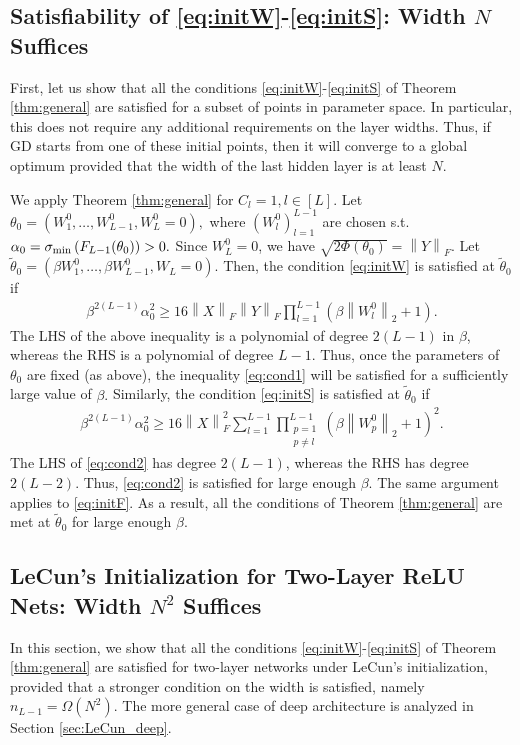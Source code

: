 \documentclass{article}
\newcommand{\norm}[1]{\left\|#1\right\|}
\newcommand{\svmin}[1]{\sigma_{\rm min}\left(#1\right)}
\begin{document}
\subsection{Satisfiability of \eqref{eq:initW}-\eqref{eq:initS}: Width $N$ Suffices}\label{sec:N}
First, let us show that all the conditions \eqref{eq:initW}-\eqref{eq:initS} of Theorem \ref{thm:general} are satisfied
for a subset of points in parameter space. 
In particular, this does not require any additional requirements on the layer widths. 
Thus, if GD starts from one of these initial points, 
then it will converge to a global optimum provided that the width of the last hidden layer is at least $N$.

We apply Theorem \ref{thm:general} for $C_l=1, l\in[L].$
Let $\theta_0=(W_1^0,\ldots,W_{L-1}^0,W_L^0=0),$
where $(W_l^0)_{l=1}^{L-1}$ are chosen s.t.\ $\alpha_0=\svmin{F_{L-1}(\theta_0)}>0.$
Since $W_L^0=0$, we have $\sqrt{2\Phi(\theta_0)}=\norm{Y}_F.$
Let $\tilde{\theta}_0=(\beta W_1^0,\ldots,\beta W_{L-1}^0,W_L=0).$
Then, the condition \eqref{eq:initW} is satisfied at $\tilde{\theta}_0$ if
\begin{align}\label{eq:cond1}
    \beta^{2(L-1)} \alpha_0^2 \geq 16 \norm{X}_F \norm{Y}_F \prod_{l=1}^{L-1} (\beta\norm{W_l^0}_2+1) .
\end{align}
The LHS of the above inequality is a polynomial of degree $2(L-1)$ in $\beta$, whereas the RHS is a polynomial of degree $L-1.$
Thus, once the parameters of $\theta_0$ are fixed (as above), the inequality \eqref{eq:cond1} will be satisfied for a sufficiently large value of $\beta.$
Similarly, the condition \eqref{eq:initS} is satisfied at $\tilde{\theta}_0$ if
\begin{align}\label{eq:cond2}
    \beta^{2(L-1)} \alpha_0^2 \geq 16 \norm{X}_F^2 \sum_{l=1}^{L-1} \prod_{\substack{p=1\\p\neq l}}^{L-1} (\beta\norm{W_p^0}_2+1)^2.
\end{align}
The LHS of \eqref{eq:cond2} has degree $2(L-1)$, whereas the RHS has degree $2(L-2).$
Thus, \eqref{eq:cond2} is satisfied for large enough $\beta.$
The same argument applies to \eqref{eq:initF}.
As a result, all the conditions of Theorem \ref{thm:general} are met at $\tilde{\theta}_0$ for large enough $\beta.$

\subsection{LeCun's Initialization for Two-Layer ReLU Nets: Width $N^2$ Suffices}\label{sec:LeCun}
In this section, we show that all the conditions \eqref{eq:initW}-\eqref{eq:initS} of Theorem \ref{thm:general} are satisfied
for two-layer networks under LeCun's initialization,
provided that a stronger condition on the width is satisfied, namely $n_{L-1}=\Omega(N^2).$
The more general case of deep architecture is analyzed in Section \ref{sec:LeCun_deep}.
\end{document}
